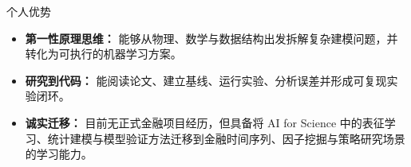 \documentclass[]{mcdowellcv}
\begin{document}
\begin{cvsection}{个人优势}
    \begin{cvsubsection}{}{}{}
        \begin{itemize}
            \item \textbf{第一性原理思维：} 能够从物理、数学与数据结构出发拆解复杂建模问题，并转化为可执行的机器学习方案。
            \item \textbf{研究到代码：} 能阅读论文、建立基线、运行实验、分析误差并形成可复现实验闭环。
            \item \textbf{诚实迁移：} 目前无正式金融项目经历，但具备将 AI for Science 中的表征学习、统计建模与模型验证方法迁移到金融时间序列、因子挖掘与策略研究场景的学习能力。
        \end{itemize}
    \end{cvsubsection}
\end{cvsection}
\end{document}
